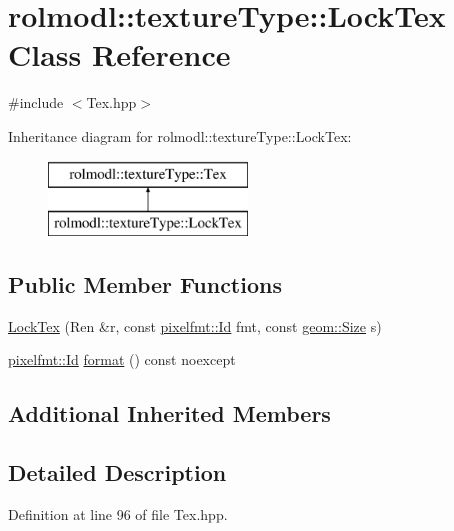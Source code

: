 \hypertarget{classrolmodl_1_1texture_type_1_1_lock_tex}{}\section{rolmodl\+::texture\+Type\+::Lock\+Tex Class Reference}
\label{classrolmodl_1_1texture_type_1_1_lock_tex}


{\ttfamily \#include $<$Tex.\+hpp$>$}

Inheritance diagram for rolmodl\+::texture\+Type\+::Lock\+Tex\+:\begin{figure}[H]
\begin{center}
\leavevmode
\includegraphics[height=2.000000cm]{classrolmodl_1_1texture_type_1_1_lock_tex}
\end{center}
\end{figure}
\subsection*{Public Member Functions}
\begin{DoxyCompactItemize}
\item 
\mbox{\hyperlink{classrolmodl_1_1texture_type_1_1_lock_tex_a70b8dd7d3bc6100a7c55c39dff33f66b}{Lock\+Tex}} (Ren \&r, const \mbox{\hyperlink{namespacerolmodl_1_1pixelfmt_a96282713e4465ba9211c8fd3a702b52b}{pixelfmt\+::\+Id}} fmt, const \mbox{\hyperlink{structrolmodl_1_1geom_1_1_size}{geom\+::\+Size}} s)
\item 
\mbox{\hyperlink{namespacerolmodl_1_1pixelfmt_a96282713e4465ba9211c8fd3a702b52b}{pixelfmt\+::\+Id}} \mbox{\hyperlink{classrolmodl_1_1texture_type_1_1_lock_tex_a053999d8ef6ffe5b4e5f3b49021286fc}{format}} () const noexcept
\end{DoxyCompactItemize}
\subsection*{Additional Inherited Members}


\subsection{Detailed Description}


Definition at line 96 of file Tex.\+hpp.



